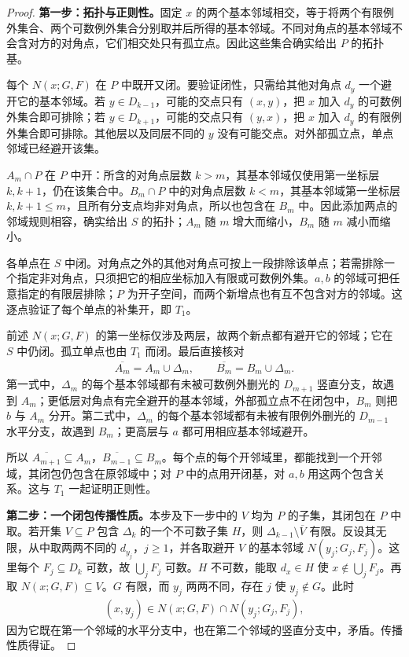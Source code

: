 \documentclass[../../main.tex]{subfiles}
\begin{document}
\begin{proof}
\textbf{第一步：拓扑与正则性。}固定 $x$ 的两个基本邻域相交，等于将两个有限例外集合、两个可数例外集合分别取并后所得的基本邻域。不同对角点的基本邻域不会含对方的对角点，它们相交处只有孤立点。因此这些集合确实给出 $P$ 的拓扑基。

每个 $N(x;G,F)$ 在 $P$ 中既开又闭。要验证闭性，只需给其他对角点 $d_y$ 一个避开它的基本邻域。若 $y\in D_{k-1}$，可能的交点只有 $(x,y)$，把 $x$ 加入 $d_y$ 的可数例外集合即可排除；若 $y\in D_{k+1}$，可能的交点只有 $(y,x)$，把 $x$ 加入 $d_y$ 的有限例外集合即可排除。其他层以及同层不同的 $y$ 没有可能交点。对外部孤立点，单点邻域已经避开该集。

$A_m\cap P$ 在 $P$ 中开：所含的对角点层数 $k>m$，其基本邻域仅使用第一坐标层 $k,k+1$，仍在该集合中。$B_m\cap P$ 中的对角点层数 $k<m$，其基本邻域第一坐标层 $k,k+1\le m$，且所有分支点均非对角点，所以也包含在 $B_m$ 中。因此添加两点的邻域规则相容，确实给出 $S$ 的拓扑；$A_m$ 随 $m$ 增大而缩小，$B_m$ 随 $m$ 减小而缩小。

各单点在 $S$ 中闭。对角点之外的其他对角点可按上一段排除该单点；若需排除一个指定非对角点，只须把它的相应坐标加入有限或可数例外集。$a,b$ 的邻域可把任意指定的有限层排除；$P$ 为开子空间，而两个新增点也有互不包含对方的邻域。这逐点验证了每个单点的补集开，即 $T_1$。

前述 $N(x;G,F)$ 的第一坐标仅涉及两层，故两个新点都有避开它的邻域；它在 $S$ 中仍闭。孤立单点也由 $T_1$ 而闭。最后直接核对
\begin{align*}
\overline{A_m}=A_m\cup\Delta_m,
\qquad \overline{B_m}=B_m\cup\Delta_m.
\end{align*}
第一式中，$\Delta_m$ 的每个基本邻域都有未被可数例外删光的 $D_{m+1}$ 竖直分支，故遇到 $A_m$；更低层对角点有完全避开的基本邻域，外部孤立点不在闭包中，$B_m$ 则把 $b$ 与 $A_m$ 分开。第二式中，$\Delta_m$ 的每个基本邻域都有未被有限例外删光的 $D_{m-1}$ 水平分支，故遇到 $B_m$；更高层与 $a$ 都可用相应基本邻域避开。

所以 $\overline{A_{m+1}}\subseteq A_m$，$\overline{B_{m-1}}\subseteq B_m$。每个点的每个开邻域里，都能找到一个开邻域，其闭包仍包含在原邻域中；对 $P$ 中的点用开闭基，对 $a,b$ 用这两个包含关系。这与 $T_1$ 一起证明正则性。

\textbf{第二步：一个闭包传播性质。}本步及下一步中的 $V$ 均为 $P$ 的子集，其闭包在 $P$ 中取。若开集 $V\subseteq P$ 包含 $\Delta_k$ 的一个不可数子集 $H$，则 $\Delta_{k-1}\setminus\overline V$ 有限。反设其无限，从中取两两不同的 $d_{y_j}$，$j\ge1$，并各取避开 $V$ 的基本邻域 $N(y_j;G_j,F_j)$。这里每个 $F_j\subseteq D_k$ 可数，故 $\bigcup_jF_j$ 可数。$H$ 不可数，能取 $d_x\in H$ 使 $x\notin\bigcup_jF_j$。再取 $N(x;G,F)\subseteq V$。$G$ 有限，而 $y_j$ 两两不同，存在 $j$ 使 $y_j\notin G$。此时
\begin{align*}
(x,y_j)\in N(x;G,F)\cap N(y_j;G_j,F_j),
\end{align*}
因为它既在第一个邻域的水平分支中，也在第二个邻域的竖直分支中，矛盾。传播性质得证。


\end{proof}
\end{document}
